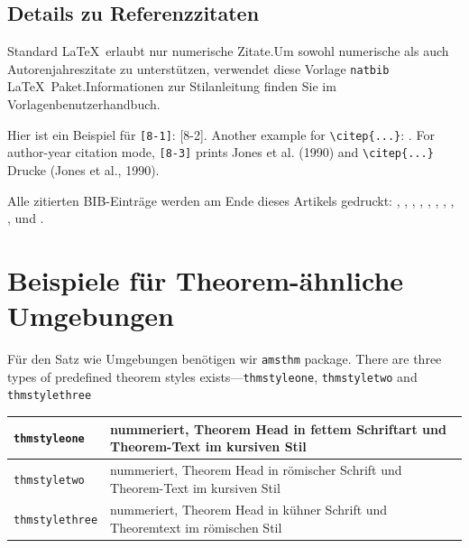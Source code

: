 \documentclass[pdflatex,sn-mathphys-num]{sn-jnl}%
\theoremstyle{thmstyleone}%
\theoremstyle{thmstyletwo}%
\theoremstyle{thmstylethree}%
\begin{document}
\subsection{Details zu Referenzzitaten} \label{subsec7}

Standard \LaTeX \ erlaubt nur numerische Zitate.Um sowohl numerische als auch Autorenjahreszitate zu unterstützen, verwendet diese Vorlage \verb+natbib+ \LaTeX \ Paket.Informationen zur Stilanleitung finden Sie im Vorlagenbenutzerhandbuch.

Hier ist ein Beispiel für \verb+[8-1]+: [8-2]. Another example for \verb+\citep{...}+: \citep{bib2}. For author-year citation mode, \verb+[8-3]+ prints Jones et al. (1990) and \verb+\citep{...}+ Drucke (Jones et al., 1990).

Alle zitierten BIB-Einträge werden am Ende dieses Artikels gedruckt: \cite{bib3}, \cite{bib4}, \cite{bib5}, \cite{bib6}, \cite{bib7}, \cite{bib8}, \cite{bib9}, \cite{bib10}, \cite{bib11}, \cite{bib12} und \cite{bib13}.

\section{Beispiele für Theorem-ähnliche Umgebungen} \label{sec10}

Für den Satz wie Umgebungen benötigen wir \verb+amsthm+ package. There are three types of predefined theorem styles exists---\verb+thmstyleone+, \verb+thmstyletwo+ and \verb+thmstylethree+

\bigskip
\begin{tabular}{|l|p{19pc}|}
\hline
\verb+thmstyleone+ & nummeriert, Theorem Head in fettem Schriftart und Theorem-Text im kursiven Stil \\ \hline
\verb+thmstyletwo+ & nummeriert, Theorem Head in römischer Schrift und Theorem-Text im kursiven Stil \\ \hline
\verb+thmstylethree+ & nummeriert, Theorem Head in kühner Schrift und Theoremtext im römischen Stil \\ \hline
\end{tabular}
\bigskip
\end{document}
